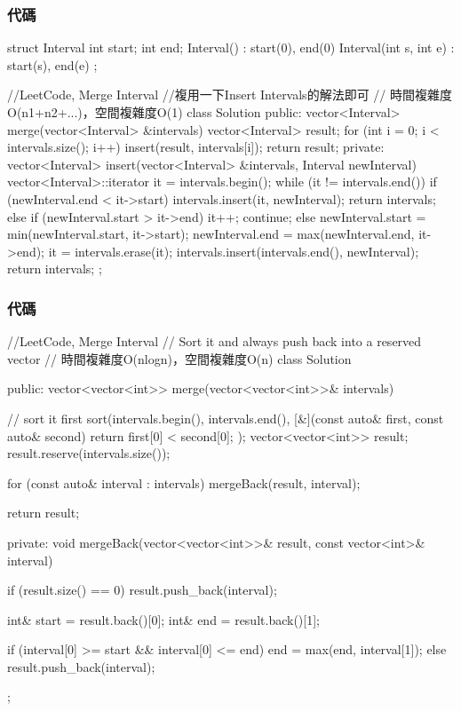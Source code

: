 \subsubsection{代碼}
\begin{Code}
struct Interval {
    int start;
    int end;
    Interval() : start(0), end(0) { }
    Interval(int s, int e) : start(s), end(e) { }
};

//LeetCode, Merge Interval
//複用一下Insert Intervals的解法即可
// 時間複雜度O(n1+n2+...)，空間複雜度O(1)
class Solution {
public:
    vector<Interval> merge(vector<Interval> &intervals) {
        vector<Interval> result;
        for (int i = 0; i < intervals.size(); i++) {
            insert(result, intervals[i]);
        }
        return result;
    }
private:
    vector<Interval> insert(vector<Interval> &intervals, Interval newInterval) {
        vector<Interval>::iterator it = intervals.begin();
        while (it != intervals.end()) {
            if (newInterval.end < it->start) {
                intervals.insert(it, newInterval);
                return intervals;
            } else if (newInterval.start > it->end) {
                it++;
                continue;
            } else {
                newInterval.start = min(newInterval.start, it->start);
                newInterval.end = max(newInterval.end, it->end);
                it = intervals.erase(it);
            }
        }
        intervals.insert(intervals.end(), newInterval);
        return intervals;
    }
};
\end{Code}
\subsubsection{代碼}
\begin{Code}
//LeetCode, Merge Interval
// Sort it and always push back into a reserved vector
// 時間複雜度O(nlogn)，空間複雜度O(n)
class Solution {
public:
    vector<vector<int>> merge(vector<vector<int>>& intervals) {
        // sort it first
        sort(intervals.begin(), intervals.end(), [&](const auto& first, const auto& second)
             {
                return first[0] < second[0];
             });
        vector<vector<int>> result;
        result.reserve(intervals.size());

        for (const auto& interval : intervals)
            mergeBack(result, interval);

        return result;
    }
private:
    void mergeBack(vector<vector<int>>& result, const vector<int>& interval) {
        if (result.size() == 0) result.push_back(interval);

        int& start = result.back()[0];
        int& end = result.back()[1];

        if (interval[0] >= start && interval[0] <= end)
            end = max(end, interval[1]);
        else
            result.push_back(interval);
    }
};
\end{Code}


